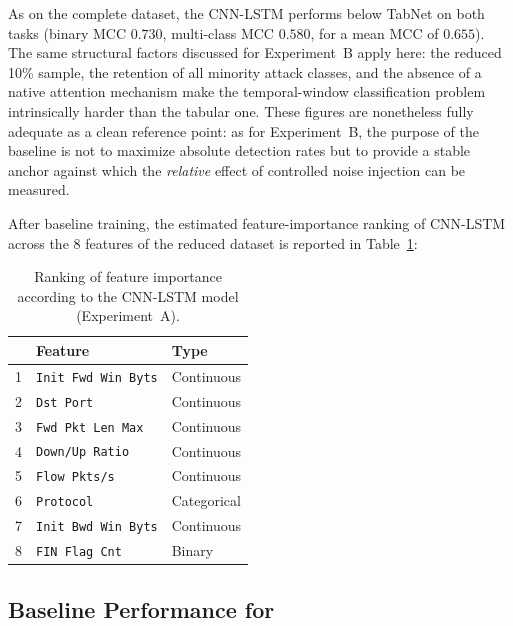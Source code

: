 \documentclass[../main.tex]{subfiles}
\begin{document}
As on the complete dataset, the CNN-LSTM performs below TabNet on both tasks (binary MCC $0.730$, multi-class MCC $0.580$, for a mean MCC of $0.655$). The same structural factors discussed for Experiment~B apply here: the reduced 10\% sample, the retention of all minority attack classes, and the absence of a native attention mechanism make the temporal-window classification problem intrinsically harder than the tabular one. These figures are nonetheless fully adequate as a clean reference point: as for Experiment~B, the purpose of the baseline is not to maximize absolute detection rates but to provide a stable anchor against which the \emph{relative} effect of controlled noise injection can be measured.

After baseline training, the estimated feature-importance ranking of CNN-LSTM across the 8 features of the reduced dataset is reported in Table~\ref{tab:final-ranking-features-CNN-LSTM-baseline-expA}:

\begin{table}[H]
    \centering
    \caption{Ranking of feature importance according to the CNN-LSTM model (Experiment~A).}
    \label{tab:final-ranking-features-CNN-LSTM-baseline-expA}
    \small
    \begin{tabular}{lll}
    \toprule
    \textbf{} & \textbf{Feature}            & \textbf{Type} \\
    \midrule
     1 &  \texttt{Init Fwd Win Byts}  & Continuous             \\
     2 &  \texttt{Dst Port}           & Continuous             \\
     3 &  \texttt{Fwd Pkt Len Max}    & Continuous             \\
     4 &  \texttt{Down/Up Ratio}      & Continuous             \\
     5 &  \texttt{Flow Pkts/s}        & Continuous             \\
     6 &  \texttt{Protocol}           & Categorical            \\
     7 &  \texttt{Init Bwd Win Byts}  & Continuous             \\
     8 &  \texttt{FIN Flag Cnt}       & Binary                 \\
    \bottomrule
    \end{tabular}
\end{table}


\newpage
\subsection{Baseline Performance for }
\label{sec:baseline-performance}
\end{document}
